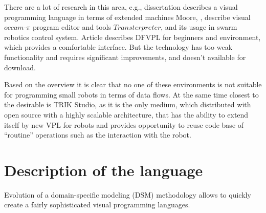 \documentclass[conference,compsoc]{IEEEtran}
\begin{document}
There are a lot of research in this area, e.g., dissertation\cite{banyasad2000visual} describes a visual programming language in terms of extended machines Moore, \cite{simpson2008visual},\cite{posso2011process} describe visual $occam\mbox{-}\pi$ program editor and tools $Transterpreter$, and its usage in swarm robotics control system. Article\cite{diprose2011ruru} describes DFVPL for beginners and environment, which provides a comfortable interface. But the technology has too weak functionality and requires significant improvements, and doesn't available for download.

Based on the overview it is clear that no one of these environments is not suitable for programming small robots in terms of data flows. At the same time closest to the desirable is TRIK Studio, as it is the only medium, which distributed with open source with a highly scalable architecture, that has the ability to extend itself by new VPL for robots and provides opportunity to reuse code base of ``routine'' operations such as the interaction with the robot.


\section{Description of the language}
\label{sec:lang}
Evolution of a domain-specific modeling (DSM) methodology allows to quickly create a fairly sophisticated visual programming languages\cite{DSM}.


\end{document}
